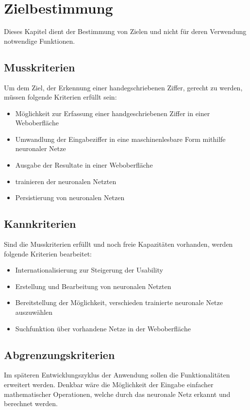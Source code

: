 \chapter{Zielbestimmung}
Dieses Kapitel dient der Bestimmung von Zielen und nicht für deren Verwendung
notwendige Funktionen.
 
\section{Musskriterien}

Um dem Ziel, der Erkennung einer handegschriebenen Ziffer, gerecht zu werden, müssen 
folgende Kriterien erfüllt sein:

\begin{itemize}
\item Möglichkeit zur Erfassung einer handgeschriebenen Ziffer in einer Weboberfläche
\item Umwandlung der Eingabeziffer in eine maschinenlesbare Form mithilfe neuronaler Netze
\item Ausgabe der Resultate in einer Weboberfläche
\item trainieren der neuronalen Netzten
\item Persistierung von neuronalen Netzen
\end{itemize}
 
\section{Kannkriterien}

Sind die Musskriterien erfüllt und noch freie Kapazitäten vorhanden, werden folgende Kriterien bearbeitet:

\begin{itemize}
\item Internationalisierung zur Steigerung der Usability
\item Erstellung und Bearbeitung von neuronalen Netzten
\item Bereitstellung der Möglichkeit, verschieden trainierte neuronale Netze auszuwählen
\item Suchfunktion über vorhandene Netze in der Weboberfläche
\end{itemize}

 
\section{Abgrenzungskriterien}
Im späteren Entwicklungszyklus der Anwendung sollen die Funktionalitäten erweitert werden. Denkbar wäre die Möglichkeit
der Eingabe einfacher mathematischer Operationen, welche durch das neuronale Netz erkannt und berechnet werden.
